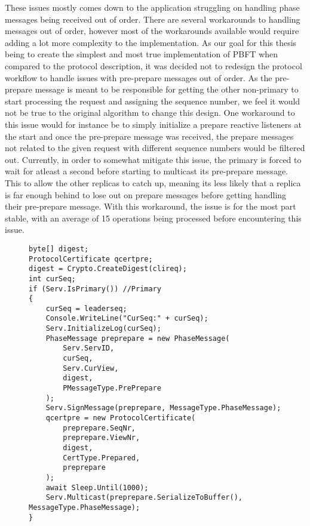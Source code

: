 These issues mostly comes down to the application struggling on handling phase messages being received out of order. There are several workarounds to handling messages out of order, however most of the workarounds available would require adding a lot more complexity to the implementation. As our goal for this thesis being to create the simplest and most true implementation of PBFT when compared to the protocol description, it was decided not to redesign the protocol workflow to handle issues with pre-prepare messages out of order. As the pre-prepare message is meant to be responsible for getting the other non-primary to start processing the request and assigning the sequence number, we feel it would not be true to the original algorithm to change this design. One workaround to this issue would for instance be to simply initialize a prepare reactive listeners at the start and once the pre-prepare message was received, the prepare messages not related to the given request with different sequence numbers would be filtered out. Currently, in order to somewhat mitigate this issue, the primary is forced to wait for atleast a second before starting to multicast its pre-prepare message. This to allow the other replicas to catch up, meaning its less likely that a replica is far enough behind to lose out on prepare messages before getting handling their pre-prepare message. With this workaround, the issue is for the most part stable, with an average of 15 operations being processed before encountering this issue.

\begin{figure}[H]
	\centering
	\begin{lstlisting}[label = code:Pre-PreparePrimary, caption= Source code for pre-prepare phase for primary replica, captionpos = b, basicstyle=\scriptsize]
byte[] digest;
ProtocolCertificate qcertpre;
digest = Crypto.CreateDigest(clireq);
int curSeq; 
if (Serv.IsPrimary()) //Primary
{
    curSeq = leaderseq;
    Console.WriteLine("CurSeq:" + curSeq);
    Serv.InitializeLog(curSeq);
    PhaseMessage preprepare = new PhaseMessage(
        Serv.ServID, 
    	curSeq, 
        Serv.CurView, 
        digest, 
        PMessageType.PrePrepare
    );
    Serv.SignMessage(preprepare, MessageType.PhaseMessage);
    qcertpre = new ProtocolCertificate(
        preprepare.SeqNr, 
        preprepare.ViewNr, 
        digest, 
        CertType.Prepared, 
        preprepare
    );
    await Sleep.Until(1000);
    Serv.Multicast(preprepare.SerializeToBuffer(), MessageType.PhaseMessage);
}
	\end{lstlisting}
\end{figure}

